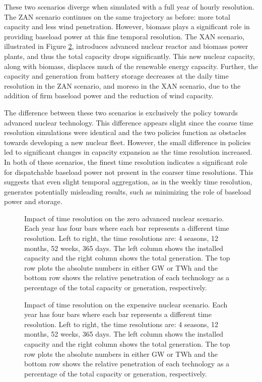 These two scenarios diverge when simulated with a full year of hourly
resolution. The \gls{ZAN} scenario continues on the same trajectory as before:
more total capacity and less wind penetration. However, biomass plays
a significant role in providing baseload power at this fine temporal resolution.
The \gls{XAN} scenario, illustrated in Figure \ref{fig:time_res_XAN}, introduces
advanced nuclear reactor and biomass power plants, and
thus the total capacity drops significantly.  This new nuclear capacity, along
with biomass, displaces much of the renewable energy capacity.
Further, the capacity and generation from battery storage decreases
at the daily time resolution in the \gls{ZAN} scenario, and moreso in the \gls{XAN}
scenario, due to the addition of firm baseload power and the reduction of wind
capacity.

The difference between these two scenarios is exclusively the policy
towards advanced nuclear technology. This difference appears slight since the coarse
time resolution simulations were identical and the two policies function as obstacles
towards developing a new nuclear fleet. However, the small difference in policies
led to significant changes in capacity expansion as the time resolution increased.
In both of these scenarios, the finest time resolution indicates a significant
role for dispatchable baseload power not present in the coarser time resolutions.
This suggests that even slight temporal aggregation, as in the weekly time resolution,
generates potentially misleading results, such as minimizing the role of baseload
power and storage.
\begin{figure}[H]
  \centering
  \resizebox{0.95\columnwidth}{!}{}
  \caption{Impact of time resolution on the zero advanced nuclear scenario.
  Each year has four bars where each bar represents a different time resolution.
  Left to right, the time resolutions are: 4 seasons, 12 months, 52 weeks, 365 days.
  The left column shows the installed capacity and the right column shows the
  total generation. The top row plots the absolute numbers in either GW or TWh
  and the bottom row shows the relative penetration of each technology as a
  percentage of the total capacity or generation, respectively.}
  \label{fig:time_res_ZAN}
\end{figure}
\begin{figure}[H]
  \centering
  \resizebox{0.95\columnwidth}{!}{}
  \caption{Impact of time resolution on the expensive nuclear scenario.
  Each year has four bars where each bar represents a different time resolution.
  Left to right, the time resolutions are: 4 seasons, 12 months, 52 weeks, 365 days.
  The left column shows the installed capacity and the right column shows the
  total generation. The top row plots the absolute numbers in either GW or TWh
  and the bottom row shows the relative penetration of each technology as a
  percentage of the total capacity or generation, respectively.}
  \label{fig:time_res_XAN}
\end{figure}


